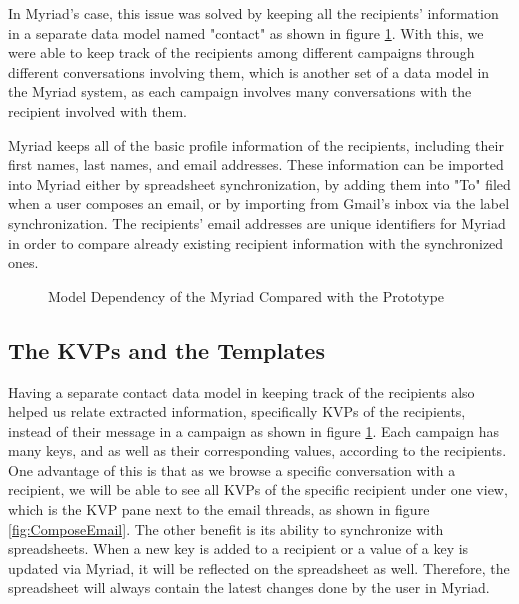 In Myriad's case, this issue was solved by keeping all the recipients' information in a separate data model named "contact" as shown in figure \ref{fig:UML_Draw_Final}. With this, we were able to keep track of the recipients among different campaigns through different conversations involving them, which is another set of a data model in the Myriad system, as each campaign involves many conversations with the recipient involved with them.
\vspace{1cm}

Myriad keeps all of the basic profile information of the recipients, including their first names, last names, and email addresses. These information can be imported into Myriad either by spreadsheet synchronization, by adding them into "To" filed when a user composes an email, or by importing from Gmail's inbox via the label synchronization. The recipients' email addresses are unique identifiers for Myriad in order to compare already existing recipient information with the synchronized ones. 

\begin{figure}[htbp]
	\centering
	\begin{pdfpic}
	    
	\end{pdfpic}
	\caption[Model Dependency of the Myriad Compared with the Prototype]{Model Dependency of the Myriad Compared with the Prototype}
	\label{fig:UML_Draw_Final}
\end{figure}

\subsection{The \ac{KVP}s and the Templates}
\label{subsec:5.3.2:KVPsTemp}

Having a separate contact data model in keeping track of the recipients also helped us relate extracted information, specifically \ac{KVP}s of the recipients, instead of their message in a campaign as shown in figure \ref{fig:UML_Draw_Final}. Each campaign has many keys, and as well as their corresponding values, according to the recipients. One advantage of this is that as we browse a specific conversation with a recipient, we will be able to see all \ac{KVP}s of the specific recipient under one view, which is the \ac{KVP} pane next to the email threads, as shown in figure \ref{fig:ComposeEmail}. The other benefit is its ability to synchronize with spreadsheets. When a new key is added to a recipient or a value of a key is updated via Myriad, it will be reflected on the spreadsheet as well. Therefore, the spreadsheet will always contain the latest changes done by the user in Myriad. 
\vspace{1cm}

